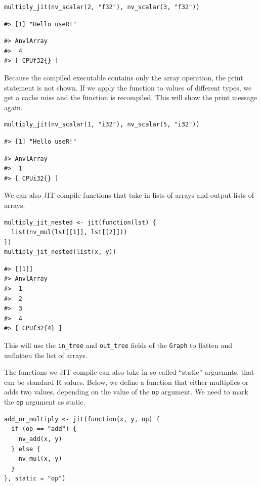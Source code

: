 \begin{verbatim}
multiply_jit(nv_scalar(2, "f32"), nv_scalar(3, "f32"))
\end{verbatim}

\begin{verbatim}
#> [1] "Hello useR!"
\end{verbatim}

\begin{verbatim}
#> AnvlArray
#>  4
#> [ CPUf32{} ]
\end{verbatim}

Because the compiled executable contains only the array operation, the print statement is not shown.
If we apply the function to values of different types, we get a cache miss and the function is recompiled.
This will show the print message again.

\begin{verbatim}
multiply_jit(nv_scalar(1, "i32"), nv_scalar(5, "i32"))
\end{verbatim}

\begin{verbatim}
#> [1] "Hello useR!"
\end{verbatim}

\begin{verbatim}
#> AnvlArray
#>  1
#> [ CPUi32{} ]
\end{verbatim}

We can also JIT-compile functions that take in lists of arrays and output lists of arrays.

\begin{verbatim}
multiply_jit_nested <- jit(function(lst) {
  list(nv_mul(lst[[1]], lst[[2]]))
})
multiply_jit_nested(list(x, y))
\end{verbatim}

\begin{verbatim}
#> [[1]]
#> AnvlArray
#>  1
#>  2
#>  3
#>  4
#> [ CPUf32{4} ]
\end{verbatim}

This will use the \texttt{in\_tree} and \texttt{out\_tree} fields of the \texttt{Graph} to flatten and unflatten the list of arrays.

The functions we JIT-compile can also take in so called ``static'' arguemnts, that can be standard R values.
Below, we define a function that either multiplies or adds two values, depending on the value of the \texttt{op} argument.
We need to mark the \texttt{op} argument as static.

\begin{verbatim}
add_or_multiply <- jit(function(x, y, op) {
  if (op == "add") {
    nv_add(x, y)
  } else {
    nv_mul(x, y)
  }
}, static = "op")
\end{verbatim}


